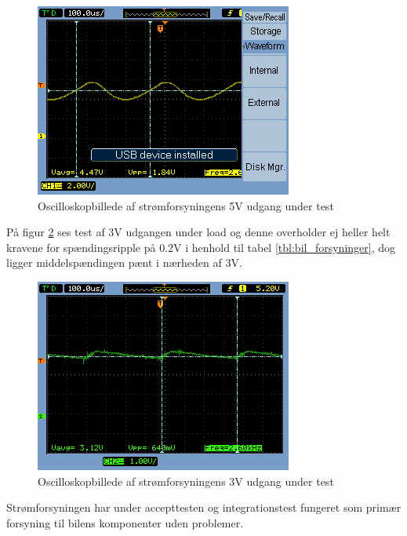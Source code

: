 \begin{figure}[h]
\centering
\includegraphics[scale=1]{../fig/billeder/impl_psu/psu_test_5V_2A}
\caption{Oscilloskopbillede af strømforsyningens 5V udgang under test}
\label{fig:psu_test_5v}
\end{figure}

\clearpage

På figur \ref{fig:psu_test_3v} ses test af 3V udgangen under load og denne overholder ej heller helt kravene for spændingsripple på 0.2V i henhold til tabel \ref{tbl:bil_forsyninger}, dog ligger middelspændingen pænt i nærheden af 3V.

\begin{figure}[h]
\centering
\includegraphics[scale=1]{../fig/billeder/impl_psu/psu_test_3V_100mA}
\caption{Oscilloskopbillede af strømforsyningens 3V udgang under test}
\label{fig:psu_test_3v}
\end{figure}

Strømforsyningen har under accepttesten og integrationstest fungeret som primær forsyning til bilens komponenter uden problemer.